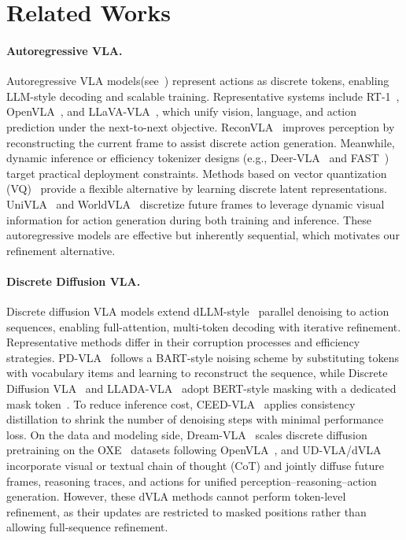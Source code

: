 \section{Related Works}
\paragraph{Autoregressive VLA.}
Autoregressive VLA models(see~) represent actions as discrete tokens, enabling LLM-style decoding and scalable training.
Representative systems include RT-1~\citep{brohan2022rt}, OpenVLA~\citep{kim2024openvla}, and LLaVA-VLA~\citep{song2026rethinking}, which unify vision, language, and action prediction under the next-to-next objective.
ReconVLA~\citep{song2025reconvla} improves perception by reconstructing the current frame to assist discrete action generation.
Meanwhile, dynamic inference or efficiency tokenizer designs (e.g., Deer-VLA~\citep{yue2024deer} and FAST~\citep{pertsch2025fast}) target practical deployment constraints.
Methods based on vector quantization (VQ)~\citep{wang2025vq,liu2025faster,dong2026actioncodec} provide a flexible alternative by learning discrete latent representations.
UniVLA~\citep{univla} and WorldVLA~\citep{worldvla} discretize future frames to leverage dynamic visual information for action generation during both training and inference.
% 
These autoregressive models are effective but inherently sequential, which motivates our refinement alternative.
\paragraph{Discrete Diffusion VLA.}
Discrete diffusion VLA models extend dLLM-style~\citep{yu2025discrete} parallel denoising to action sequences, enabling full-attention, multi-token decoding with iterative refinement.
Representative methods differ in their corruption processes and efficiency strategies.
PD-VLA~\citep{song2025accelerating} follows a BART-style noising scheme by substituting tokens with vocabulary items and learning to reconstruct the sequence, while Discrete Diffusion VLA~\citep{liang2025discrete} and LLADA-VLA~\citep{wen2025llada} adopt BERT-style masking with a dedicated mask token~\citep{bert}.
To reduce inference cost, CEED-VLA~\citep{song2025ceed} applies consistency distillation to shrink the number of denoising steps with minimal performance loss.
On the data and modeling side, Dream-VLA~\citep{ye2025dream} scales discrete diffusion pretraining on the OXE~\citep{o2024open} datasets following OpenVLA~\citep{kim2024openvla}, and UD-VLA/dVLA~\citep{chen2025unified,wen2025dvla} incorporate visual or textual chain of thought (CoT) and jointly diffuse future frames, reasoning traces, and actions for unified perception--reasoning--action generation.
However, these dVLA methods cannot perform token-level refinement, as their updates are restricted to masked positions rather than allowing full-sequence refinement.
